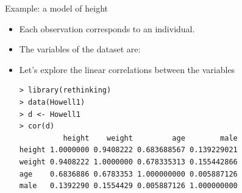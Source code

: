 \documentclass[handout]{beamer}
\begin{document}
\begin{frame}[fragile]{Example: a model of height}
\scriptsize{
\begin{itemize}
 \item Each observation corresponds to an individual.
 \item The variables of the dataset are:
 
\item Let's explore the linear correlations between the variables

 \begin{verbatim}
> library(rethinking)
> data(Howell1)
> d <- Howell1
> cor(d)
          height    weight         age        male
height 1.0000000 0.9408222 0.683688567 0.139229021
weight 0.9408222 1.0000000 0.678335313 0.155442866
age    0.6836886 0.6783353 1.000000000 0.005887126
male   0.1392290 0.1554429 0.005887126 1.000000000
 \end{verbatim}

 
 
 
\end{itemize}
 
 
 
 
} 
\end{frame}
\end{document}
